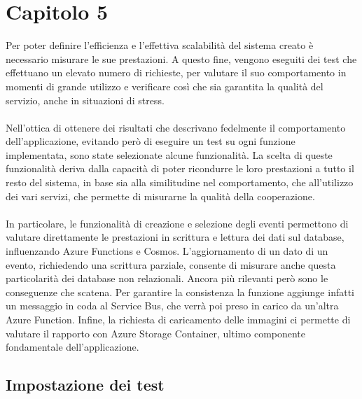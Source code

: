 \chapter{Capitolo 5}
Per poter definire l'efficienza e l'effettiva scalabilità del sistema creato 
è necessario misurare le sue prestazioni. 
A questo fine, vengono eseguiti dei test che effettuano un elevato numero di richieste,
per valutare il suo comportamento in momenti di grande utilizzo e
verificare così che sia garantita la qualità del servizio, anche in situazioni di stress.\\
\\
Nell'ottica di ottenere dei risultati che descrivano fedelmente 
il comportamento dell'applicazione, 
evitando però di eseguire un test su ogni funzione implementata,
sono state selezionate alcune funzionalità.
La scelta di queste funzionalità deriva dalla capacità 
di poter ricondurre le loro prestazioni a tutto il resto del sistema,
in base sia alla similitudine nel comportamento,
che all'utilizzo dei vari servizi, che permette di misurarne la qualità della cooperazione.\\
\\
In particolare, le funzionalità di creazione e selezione degli eventi permettono 
di valutare direttamente le prestazioni in scrittura e lettura dei dati sul database, 
influenzando Azure Functions e Cosmos.
L'aggiornamento di un dato di un evento,
richiedendo una scrittura parziale, 
consente di misurare anche questa particolarità dei database non relazionali.
Ancora più rilevanti però sono le conseguenze che scatena.
Per garantire la consistenza la funzione aggiunge infatti un messaggio in coda al Service Bus,
che verrà poi preso in carico da un'altra Azure Function.
Infine, la richiesta di caricamento delle immagini ci permette 
di valutare il rapporto con Azure Storage Container, 
ultimo componente fondamentale dell'applicazione.
\clearpage
\section{Impostazione dei test}

